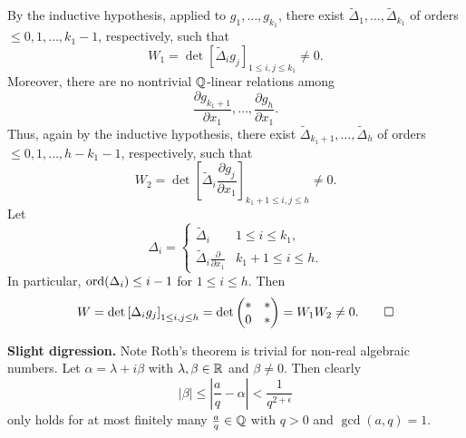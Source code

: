\documentclass{Vorlesungstemplate_English} %
\begin{document}
\begin{pf}
  By the inductive hypothesis, applied to $g_1,\dots,g_{k_1}$, there exist $\widetilde\Delta_1,\dots,\widetilde\Delta_{k_1}$ of orders $\leq 0,1,\dots,k_1-1$, respectively, such that
  \[
    W_1=\det\left[\widetilde\Delta_i g_j\right]_{1 \leq i,j \leq k_1}\neq 0.
  \]
  Moreover, there are no nontrivial $\mathbb{Q}$-linear relations among
  \[
    \frac{\partial g_{k_1+1}}{\partial x_1},\dots,\frac{\partial g_h}{\partial x_1}.
  \]
  Thus, again by the inductive hypothesis, there exist $\widetilde\Delta_{k_1+1},\dots,\widetilde\Delta_h$ of orders $\leq 0,1,\dots,h-k_1-1$, respectively, such that
  \[
    W_2=\det\left[\widetilde\Delta_i\frac{\partial g_j}{\partial x_1}\right]_{k_1+1 \leq i,j \leq h}\neq 0.
  \]
  Let
  \[
    \Delta_i=
    \begin{cases}
      \widetilde\Delta_i & 1 \leq i \leq k_1, \\
      \widetilde\Delta_i\frac{\partial}{\partial x_1} & k_1+1 \leq i \leq h.
    \end{cases}
  \]
  In particular, $\text{ord}(\Delta_i)\leq i-1$ for $1 \leq i \leq h$. Then
  \[
    W=\det\left[\Delta_i g_j\right]_{1 \leq i,j \leq h}
    =
    \det\begin{pmatrix}
      * & * \\
      0 & *
    \end{pmatrix}
    = W_1W_2\neq 0. \qedhere
  \]
\end{pf}

\noindent\textbf{Slight digression.} Note Roth's theorem is trivial for non-real algebraic numbers. Let $\alpha=\lambda+i\beta$ with $\lambda,\beta\in\mathbb{R}$ and $\beta\neq 0$. Then clearly
\[
  |\beta|\leq \left|\frac aq-\alpha\right|<\frac{1}{q^{2+\epsilon}}
\]
only holds for at most finitely many $\frac aq\in\mathbb{Q}$ with $q>0$ and $\gcd(a,q)=1$.
\end{document}
